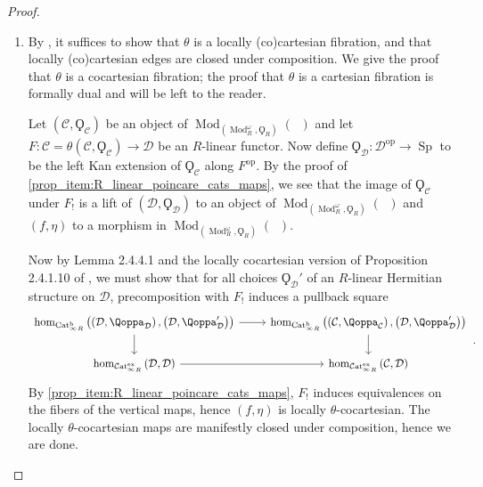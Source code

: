\documentclass{article}
\DeclareMathOperator{\Cat}{\mathcal{C}at} %
\DeclareMathOperator{\Catex}{\Cat_\infty^{ex}} %
\DeclareMathOperator{\Cath}{Cat^h_\infty} %
\DeclareMathOperator{\Mod}{Mod} %
\DeclareMathOperator{\Spectra}{Sp} %
\newcommand{\op}{\mathrm{op}} %
\theoremstyle{definition}
\begin{document}
\begin{proof}
\begin{enumerate}[label=(\arabic*)]
        \item By \cite[Proposition 2.4.2.8]{HTT}, it suffices to show that $ \theta $ is a locally (co)cartesian fibration, and that locally (co)cartesian edges are closed under composition. 
        We give the proof that $ \theta $ is a cocartesian fibration; the proof that $ \theta $ is a cartesian fibration is formally dual and will be left to the reader. 

        Let $ \left(\mathcal{C}, \Qoppa_{\mathcal{C}}\right) $ be an object of $ \Mod_{\left(\Mod_R^\omega, \Qoppa_R \right)}(\Cath) $ and let $ F \colon \mathcal{C} = \theta \left(\mathcal{C}, \Qoppa_{\mathcal{C}}\right)\to \mathcal{D} $ be an $ R $-linear functor. 
        Now define $ \Qoppa_{\mathcal{D}} \colon \mathcal{D}^\op \to \Spectra $ to be the left Kan extension of $ \Qoppa_{\mathcal{C}} $ along $ F^\op $. 
        By the proof of \ref{prop_item:R_linear_poincare_cats_maps}, we see that the image of $ \Qoppa_{\mathcal{C}} $ under $ F_! $ is a lift of $ \left(\mathcal{D}, \Qoppa_{\mathcal{D}}\right) $ to an object of $ \Mod_{\left(\Mod_R^\omega, \Qoppa_R \right)}(\Cath) $ and $ (f, \eta) $ to a morphism in $ \Mod_{\left(\Mod_R^\omega, \Qoppa_R \right)}(\Cath) $. 

        Now by Lemma 2.4.4.1 and the locally cocartesian version of Proposition 2.4.1.10 of \cite{HTT}, we must show that for all choices $ \Qoppa_{\mathcal{D}}' $ of an $ R $-linear Hermitian structure on $ \mathcal{D} $, precomposition with $ F_! $ induces a pullback square
        \begin{equation}
        \begin{tikzcd}
            \hom_{\Cath_R}\left(\left(\mathcal{D}, \Qoppa_{\mathcal{D}}\right), \left(\mathcal{D}, \Qoppa_{\mathcal{D}}'\right)\right) \ar[d] \ar[r] & \hom_{\Cath_R}\left(\left(\mathcal{C}, \Qoppa_{\mathcal{C}}\right), \left(\mathcal{D}, \Qoppa_{\mathcal{D}}'\right)\right) \ar[d] \\
            \hom_{\Catex_R}\left(\mathcal{D}, \mathcal{D}\right) \ar[r] & \hom_{\Catex_R}\left(\mathcal{C}, \mathcal{D} \right)
        \end{tikzcd}\,.
        \end{equation}
        By \ref{prop_item:R_linear_poincare_cats_maps}, $ F_! $ induces equivalences on the fibers of the vertical maps, hence $ (f, \eta) $ is locally $ \theta $-cocartesian. 
        The locally $ \theta $-cocartesian maps are manifestly closed under composition, hence we are done.        \qedhere
    \end{enumerate}
\end{proof}
\end{document}
